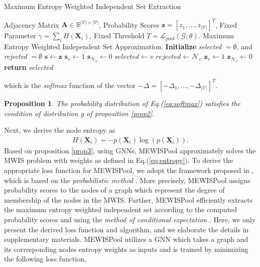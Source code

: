 \documentclass{article}
\newtheorem{prop}{Proposition}
\begin{document}
\begin{algorithm}[tb]
	\caption{Maximum Entropy Weighted Independent Set Extraction}
	\label{tab:1}
	\begin{algorithmic}[1]
		\REQUIRE Adjacency Matrix $\boldsymbol{A} \in \mathbb{R}^{|\mathcal{V}| \times |\mathcal{V}|}$, Probability Scores $\mathbf{z} = [z_1,\dots,z_{|\mathcal{V}|}]^T$, Fixed Parameter $\gamma = \sum_{i}H(\mathbf{X}_i)$, Fixed Threshold $T = \mathcal{L}_{\textrm{pool}}(\mathcal{G};\theta)$.
		\ENSURE Maximum Entropy Weighted Independent Set Approximation.
		\STATE \textbf{Initialize} \textit{selected} $ = \emptyset$, and \textit{rejected}  $ = \emptyset$
		\STATE $\mathbf{s} \leftarrow \mathbf{z}$
		\STATE $\mathbf{s}_v \leftarrow 1$
		\STATE $\mathbf{s}_{\mathcal{N}_v} \leftarrow 0$
		\STATE $selected \leftarrow v$
		\STATE $rejected \leftarrow \mathcal{N}_v$
		\STATE $\mathbf{z}_v \leftarrow 1$
		\STATE $\mathbf{z}_{\mathcal{N}_v} \leftarrow 0$
		\ENDIF
		\ENDIF
		\ENDFOR
		\STATE \textbf{return} $selected$
	\end{algorithmic}
\end{algorithm}
which is the \textit{softmax} function of the vector $-\Delta = [-\Delta_1, \dots, -\Delta_{|\mathcal{V}|}]^T$. 
\begin{prop}\label{prop4}
	The probability distribution of Eq.(\ref{eq:softmax}) satisfies the condition of distribution $g$ of proposition \ref{prop2}.
\end{prop}
Next, we derive the node entropy as
\begin{gather}
	\label{eq:entropy}
	H(\mathbf{X}_i) = -p(\mathbf{X}_i)\log(p(\mathbf{X}_i)).
\end{gather}
Based on proposition \ref{prop3}, using GNNs, MEWISPool approximately solves the MWIS problem with weights as defined in Eq.(\ref{eq:entropy}). To derive the appropriate loss function for MEWISPool, we adopt the framework proposed in \cite{erdos}, which is based on the \textit{probabilistic method} \cite{erdos1959graph, probabilisticmethod}. More precisely, MEWISPool assigns probability scores to the nodes of a graph which represent the degree of membership of the nodes in the MWIS. Further, MEWISPool efficiently extracts the maximum entropy weighted independent set according to the computed probability scores and using the \textit{method of conditional expectation} \cite{raghavan}. Here, we only present the derived loss function and algorithm, and we elaborate the details in supplementary materials. MEWISPool utilizes a GNN which takes a graph and its corresponding nodes entropy weights as inputs and is trained by minimizing the following loss function,
\end{document}

